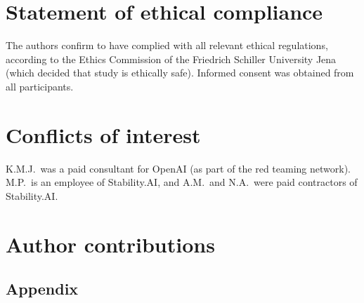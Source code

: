 \documentclass[11pt, oneside]{article}
\begin{document}
\begin{refsection}
\section*{Statement of ethical compliance}
The authors confirm to have complied with all relevant ethical regulations, according to the Ethics Commission of the Friedrich Schiller University Jena (which decided that study is ethically safe). Informed consent was obtained from all participants.


\section*{Conflicts of interest}
K.M.J.\ was a paid consultant for OpenAI (as part of the red teaming network). M.P.\ is an employee of Stability.AI, and A.M.\ and N.A.\ were paid contractors of Stability.AI.

\section*{Author contributions}

\resizebox{\textwidth}{!}{%
\scriptsize
\insertcredits
}
\normalsize
\printbibliography
\end{refsection}

\clearpage
\begin{refsection}
\renewcommand{\thefigure}{A\arabic{figure}}
\setcounter{figure}{0}

\renewcommand{\thetable}{A\arabic{table}}
\setcounter{table}{0}

\appendix
\section{Appendix}

\clearpage
\printbibliography[heading=subbibintoc]
\end{refsection}
\end{document}
